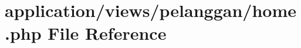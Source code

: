 \hypertarget{pelanggan_2home_8php}{}\section{application/views/pelanggan/home.php File Reference}
\label{pelanggan_2home_8php}
